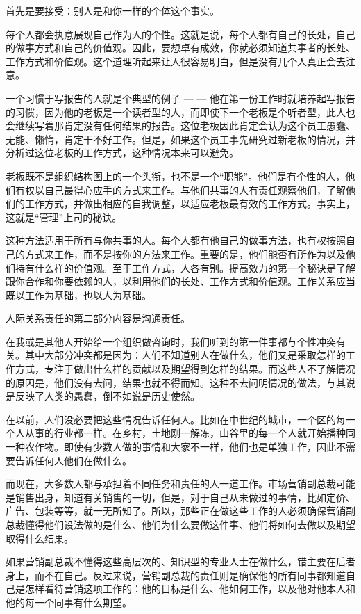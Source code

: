 \documentclass[a4paper,12pt,lang=cn,fontset = windows]{elegantpaper} %
\begin{document}
首先是要接受：别人是和你一样的个体这个事实。

每个人都会执意展现自己作为人的个性。这就是说，每个人都有自己的长处，自己的做事方式和自己的价值观。因此，要想卓有成效，你就必须知道共事者的长处、工作方式和价值观。这个道理听起来让人很容易明白，但是没有几个人真正会去注意。

一个习惯于写报告的人就是个典型的例子 — — 他在第一份工作时就培养起写报告的习惯，因为他的老板是一个读者型的人，而即使下一个老板是个听者型，此人也会继续写着那肯定没有任何结果的报告。这位老板因此肯定会认为这个员工愚蠢、无能、懒惰，肯定干不好工作。但是，如果这个员工事先研究过新老板的情况，并分析过这位老板的工作方式，这种情况本来可以避免。

老板既不是组织结构图上的一个头衔，也不是一个“职能”。他们是有个性的人，他们有权以自己最得心应手的方式来工作。与他们共事的人有责任观察他们，了解他们的工作方式，并做出相应的自我调整，以适应老板最有效的工作方式。事实上，这就是“管理”上司的秘诀。

这种方法适用于所有与你共事的人。每个人都有他自己的做事方法，也有权按照自己的方式来工作，而不是按你的方法来工作。重要的是，他们能否有所作为以及他们持有什么样的价值观。至于工作方式，人各有别。提高效力的第一个秘诀是了解跟你合作和你要依赖的人，以利用他们的长处、工作方式和价值观。工作关系应当既以工作为基础，也以人为基础。

人际关系责任的第二部分内容是沟通责任。

在我或是其他人开始给一个组织做咨询时，我们听到的第一件事都与个性冲突有关。其中大部分冲突都是因为：人们不知道别人在做什么，他们又是采取怎样的工作方式，专注于做出什么样的贡献以及期望得到怎样的结果。而这些人不了解情况的原因是，他们没有去问，结果也就不得而知。这种不去问明情况的做法，与其说是反映了人类的愚蠢，倒不如说是历史使然。

在以前，人们没必要把这些情况告诉任何人。比如在中世纪的城市，一个区的每一个人从事的行业都一样。在乡村，土地刚一解冻，山谷里的每一个人就开始播种同一种农作物。即使有少数人做的事情和大家不一样，他们也是单独工作，因此不需要告诉任何人他们在做什么。

而现在，大多数人都与承担着不同任务和责任的人一道工作。市场营销副总裁可能是销售出身，知道有关销售的一切，但是，对于自己从未做过的事情，比如定价、广告、包装等等，就一无所知了。所以，那些正在做这些工作的人必须确保营销副总裁懂得他们设法做的是什么、他们为什么要做这件事、他们将如何去做以及期望取得什么结果。

如果营销副总裁不懂得这些高层次的、知识型的专业人士在做什么，错主要在后者身上，而不在自己。反过来说，营销副总裁的责任则是确保他的所有同事都知道自己是怎样看待营销这项工作的：他的目标是什么、他如何工作，以及他对他本人和他的每一个同事有什么期望。
\end{document}

